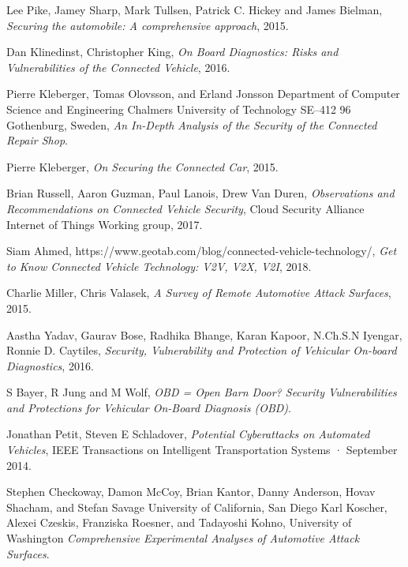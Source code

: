 \documentclass[11pt]{article}
\begin{document}
\begin{thebibliography}{10}
	
	
	Lee Pike, Jamey Sharp, Mark Tullsen, Patrick C. Hickey and James Bielman, \textit{Securing the automobile: A comprehensive approach}, 2015.
	
	Dan Klinedinst, Christopher King, 
	\textit{On Board Diagnostics: Risks and Vulnerabilities of the Connected Vehicle}, 2016.
	
	Pierre Kleberger, Tomas Olovsson, and Erland Jonsson Department of Computer Science and Engineering Chalmers University of Technology
	SE–412 96 Gothenburg, Sweden, \textit{An In-Depth Analysis of the Security of the Connected Repair Shop}.
	
	Pierre Kleberger, \textit{On Securing the Connected Car},
	2015.
	
	Brian Russell, Aaron Guzman, Paul Lanois, Drew Van Duren,
	\textit{Observations and Recommendations on Connected Vehicle Security},
	Cloud Security Alliance Internet of Things Working group, 2017.
	
	Siam Ahmed, https://www.geotab.com/blog/connected-vehicle-technology/,
	\textit{Get to Know Connected Vehicle Technology: V2V, V2X, V2I}, 2018.
	
	Charlie Miller, Chris Valasek,
	\textit{A Survey of Remote Automotive Attack Surfaces}, 2015.
	
	Aastha Yadav, Gaurav Bose, Radhika Bhange, Karan Kapoor, N.Ch.S.N Iyengar, Ronnie D. Caytiles, \textit{Security, Vulnerability and Protection of Vehicular On-board Diagnostics}, 2016.
	
	S Bayer, R Jung and M Wolf, \textit{OBD = Open Barn Door? Security Vulnerabilities and Protections for Vehicular On-Board Diagnosis (OBD)}.
	
	Jonathan Petit, Steven E Schladover,
	\textit{Potential Cyberattacks on Automated Vehicles},
	IEEE Transactions on Intelligent Transportation Systems · September 2014.
	
	Stephen Checkoway, Damon McCoy, Brian Kantor, Danny Anderson, Hovav Shacham, and Stefan Savage University of California, San Diego
	Karl Koscher, Alexei Czeskis, Franziska Roesner, and Tadayoshi Kohno,
	University of Washington
	\textit{Comprehensive Experimental Analyses of Automotive Attack Surfaces}.
	

\end{thebibliography}
\end{document}
